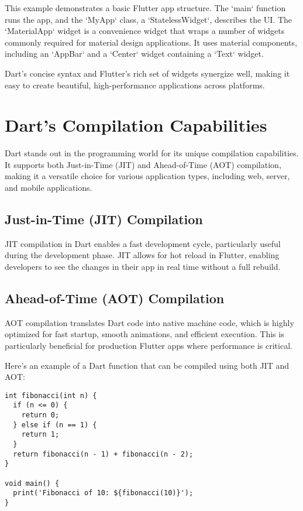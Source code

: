 \documentclass{book}
\begin{document}
This example demonstrates a basic Flutter app structure. The `main` function runs the app, and the `MyApp` class, a `StatelessWidget`, describes the UI. The `MaterialApp` widget is a convenience widget that wraps a number of widgets commonly required for material design applications. It uses material components, including an `AppBar` and a `Center` widget containing a `Text` widget.

Dart's concise syntax and Flutter's rich set of widgets synergize well, making it easy to create beautiful, high-performance applications across platforms.

\chapter{Dart's Compilation Capabilities}

Dart stands out in the programming world for its unique compilation capabilities. It supports both Just-in-Time (JIT) and Ahead-of-Time (AOT) compilation, making it a versatile choice for various application types, including web, server, and mobile applications.

\section{Just-in-Time (JIT) Compilation}
JIT compilation in Dart enables a fast development cycle, particularly useful during the development phase. JIT allows for hot reload in Flutter, enabling developers to see the changes in their app in real time without a full rebuild.

\section{Ahead-of-Time (AOT) Compilation}
AOT compilation translates Dart code into native machine code, which is highly optimized for fast startup, smooth animations, and efficient execution. This is particularly beneficial for production Flutter apps where performance is critical.

Here's an example of a Dart function that can be compiled using both JIT and AOT:

\begin{lstlisting}[style=dartstyle]
int fibonacci(int n) {
  if (n <= 0) {
    return 0;
  } else if (n == 1) {
    return 1;
  }
  return fibonacci(n - 1) + fibonacci(n - 2);
}

void main() {
  print('Fibonacci of 10: ${fibonacci(10)}');
}
\end{lstlisting}
\end{document}
